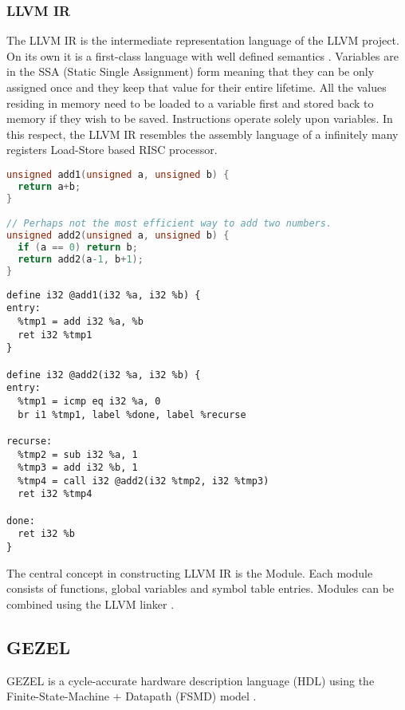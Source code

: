 \subsubsection{LLVM IR}

The LLVM IR is the intermediate representation language of the LLVM
project. On its own it is a first-class language with well defined
semantics \cite{llvm_general, llvm_master_thesis}. Variables are in the SSA (Static Single
Assignment) form meaning that they can be only assigned once and they
keep that value for their entire lifetime. All the values residing in
memory need to be loaded to a variable first and stored back to memory
if they wish to be saved. Instructions operate solely upon
variables. In this respect, the LLVM IR resembles the assembly
language of a infinitely many registers Load-Store based RISC
processor.

\begin{lstlisting}[language=C]
unsigned add1(unsigned a, unsigned b) {
  return a+b;
}

// Perhaps not the most efficient way to add two numbers.
unsigned add2(unsigned a, unsigned b) {
  if (a == 0) return b;
  return add2(a-1, b+1);
}
\end{lstlisting}

\begin{lstlisting}
define i32 @add1(i32 %a, i32 %b) {
entry:
  %tmp1 = add i32 %a, %b
  ret i32 %tmp1
}

define i32 @add2(i32 %a, i32 %b) {
entry:
  %tmp1 = icmp eq i32 %a, 0
  br i1 %tmp1, label %done, label %recurse

recurse:
  %tmp2 = sub i32 %a, 1
  %tmp3 = add i32 %b, 1
  %tmp4 = call i32 @add2(i32 %tmp2, i32 %tmp3)
  ret i32 %tmp4

done:
  ret i32 %b
}
\end{lstlisting}

\filbreak

The central concept in constructing LLVM IR is the Module. Each module
consists of functions, global variables and symbol table entries.
Modules can be combined using the LLVM linker \cite{llvm_ir}.

\subsection{GEZEL}

GEZEL is a cycle-accurate hardware description language (HDL) using the
Finite-State-Machine + Datapath (FSMD) model \cite{gezel}.

